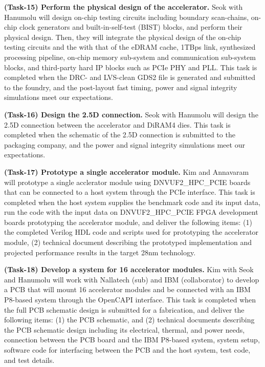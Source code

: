 \noindent
\textbf{(Task-15) Perform the physical design of the accelerator.} 
Seok with Hanumolu will design on-chip testing circuits including boundary scan-chains, on-chip clock generators and built-in-self-test (BIST) blocks, and perform their physical design.
Then, they will integrate the physical design of the on-chip testing circuits and the with that of the eDRAM cache, 1TBps link, synthesized processing pipeline, on-chip memory sub-system and communication sub-system blocks, and third-party hard IP blocks such as PCIe PHY and PLL.
This task is completed when the DRC- and LVS-clean GDS2 file is generated and submitted to the foundry, and the post-layout fast timing, power and signal integrity simulations meet our expectations.


\noindent
\textbf{(Task-16) Design the 2.5D connection.} 
Seok with Hanumolu will design the 2.5D connection between the accelerator and DiRAM4 dies.
This task is completed when the schematic of the 2.5D connection is submitted to the packaging company, and the power and signal integrity simulations meet our expectations.


\noindent
\textbf{(Task-17) Prototype a single accelerator module.}
Kim and Annavaram will prototype a single acclerator module using DNVUF2\_HPC\_PCIE boards that can be connected to a host system through the PCIe interface.
This task is completed when the host system supplies the benchmark code and its input data, run the code with the input data on DNVUF2\_HPC\_PCIE FPGA development boards prototyping the accelerator module, and deliver the following items:
(1) the completed Verilog HDL code and scripts used for prototyping the accelerator module,  
(2) technical document describing the prototyped implementation and projected performance results in the target 28nm technology.


\noindent
\textbf{(Task-18) Develop a system for 16 accelerator modules.}
Kim with Seok and Hanumolu will work with Nallatech (sub) and IBM (collaborator) to develop a PCB that will mount 16 accelerator modules and be connected with an IBM P8-based system through the OpenCAPI interface.
This task is completed when the full PCB schematic design is submitted for a fabrication, and deliver the following items:
(1) the PCB schematic, and
(2) technical documents describing the PCB schematic design including its electrical, thermal, and power needs, connection between the PCB board and the IBM P8-based system, 
system setup, software code for interfacing between the PCB and the host system, test code, and test details. 


